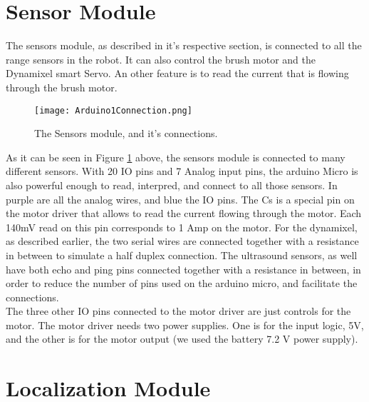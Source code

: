 \section{Sensor Module}

The sensors module, as described in it's respective section, is connected to all the range sensors in the robot. It can also control the brush motor and the Dynamixel smart Servo. An other feature is to read the current that is flowing through the brush motor.

\begin{figure}[H]
  \centering
  \texttt{[image: Arduino1Connection.png]}
  \caption{The Sensors module, and it's connections.}
\label{fig:ard1connection}
\end{figure}

As it can be seen in Figure \ref{fig:ard1connection} above, the sensors module is connected to many different sensors. With 20 IO pins and 7 Analog input pins, the arduino Micro is also powerful enough to read, interpred, and connect to all those sensors. In purple are all the analog wires, and blue the IO pins. The Cs is a special pin on the motor driver that allows to read the current flowing through the motor. Each 140mV read on this pin corresponds to 1 Amp on the motor. For the dynamixel, as described earlier, the two serial wires are connected together with a resistance in between to simulate a half duplex connection. The ultrasound sensors, as well have both echo and ping pins connected together with a resistance in between, in order to reduce the number of pins used on the arduino micro, and facilitate the connections.\\


The three other IO pins connected to the motor driver are just controls for the motor. The motor driver needs two power supplies. One is for the input logic, 5V, and the other is for the motor output (we used the battery 7.2 V power supply).

\section{Localization Module}

